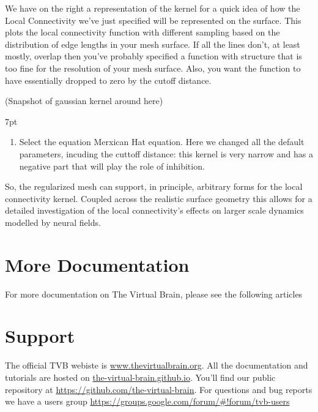 \documentclass{tufte-handout}
\newenvironment{formal}{%
  \def\FrameCommand{%
    \hspace{1pt}%
    {\color{DarkBlue}\vrule width 2pt}%
    {\color{formalshade}\vrule width 4pt}%
    \colorbox{formalshade}%
  }%
  \MakeFramed{\advance\hsize-\width\FrameRestore}%
  \noindent\hspace{-4.55pt}%
  \begin{adjustwidth}{}{7pt}%
  \vspace{2pt}\vspace{2pt}%
}
{%
  \vspace{2pt}\end{adjustwidth}\endMakeFramed%
}
\begin{document}
We have on the right a representation of the kernel for a quick idea of how
the Local Connectivity we've just specified will be represented on the
surface. This plots the local connectivity function with different sampling
based on the distribution of edge lengths in your mesh surface. If all the
lines don't, at least mostly, overlap then you've probably specified a
function with structure that is too fine for the resolution of your mesh
surface. Also, you want the function to have essentially dropped to zero by
the cutoff distance.

(Snapshot of gaussian kernel around here)

\begin{formal}
\begin{enumerate}
\item Select the equation Merxican Hat equation. Here we changed all the default parameters, incuding the cuttoff distance: this kernel is very narrow and has a negative part that will play the role of inhibition.
\end{enumerate}
\end{formal}

So, the regularized mesh can support, in principle, arbitrary forms for the
local connectivity kernel. Coupled across the realistic surface geometry this
allows for a detailed investigation of the local connectivity’s effects on
larger scale dynamics modelled by neural fields.



\section{More Documentation}\label{sec:more-doc}
For more documentation on The Virtual Brain, please see the following articles \cite{Sanz-Leon_2013, Spiegler_2013, Woodman_2014, Jirsa_2010b}


\section{Support}\label{sec:support}

The official TVB webiste is \url{www.thevirtualbrain.org}.  
All the documentation and tutorials are hosted on \url{the-virtual-brain.github.io}.
You'll find our public  repository at \url{https://github.com/the-virtual-brain}. 
For questions and bug reports we have a users group \url{https://groups.google.com/forum/#!forum/tvb-users}



\end{document}
